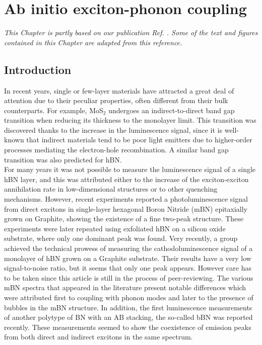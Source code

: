 \chapter{Ab initio exciton-phonon coupling} \label{chap:mBN}
\textit{This Chapter is partly based on our publication Ref. \cite{lechifflart2023first}. Some of the text and figures contained in this Chapter are adapted from this reference.}


\chaptertoc{}

%
\section{Introduction}
In recent years, single or few-layer materials have attracted a great deal of attention due to their peculiar properties, often different from their bulk counterparts. For example, MoS$_2$ undergoes an indirect-to-direct band gap transition when reducing its thickness to the monolayer limit.\cite{splendiani2010emerging,Mak_2010}
This transition was discovered thanks to the increase in the luminescence signal, since it is well-known that indirect materials tend to be poor light emitters due to higher-order processes mediating the electron-hole recombination.
A similar band gap transition was also predicted for \acrshort{hBN}.\cite{paleari2018excitons}\\

For many years it was not possible to measure the luminescence signal of a single hBN layer,\cite{schue2016dimensionality} and this was attributed either to the increase of the exciton-exciton annihilation rate in low-dimensional structures\cite{yuan2015exciton,plaud2019exciton} or to other quenching mechanisms.
However, recent experiments reported a photoluminescence signal from direct excitons in single-layer hexagonal Boron Nitride (mBN) epitaxially grown on Graphite, showing the existence of a fine two-peak structure.\cite{elias2019direct,wang2022scalable} These experiments were later repeated using exfoliated hBN on a silicon oxide substrate,\cite{rousseau2021monolayer} where only one dominant peak was found. Very recently, a group achieved the technical prowess of measuring the cathodoluminescence signal of a monolayer of hBN grown on a Graphite substrate.\cite{shima2023cathodoluminescence} Their results have a very low signal-to-noise ratio, but it seems that only one peak appears. However care has to be taken since this article is still in the process of peer-reviewing.
The various \acrshort{mBN} spectra that appeared in the literature present notable differences which were attributed first to coupling with phonon modes and later to the presence of bubbles in the \acrshort{mBN} structure.
In addition, the first luminescence measurements of another polytype of BN with an AB stacking, the so-called \acrfull{bBN} was reported recently.\cite{rousseau2022bernal, rousseau2022phonon}
These measurements seemed to show the coexistence of emission peaks from both direct and indirect excitons in the same spectrum. \\

